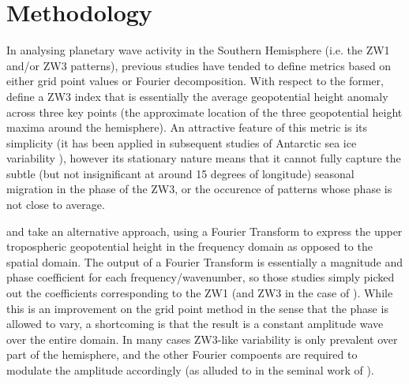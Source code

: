 \section{Methodology}

In analysing planetary wave activity in the Southern Hemisphere (i.e. the ZW1 and/or ZW3 patterns), previous studies have tended to define metrics based on either grid point values or Fourier decomposition. With respect to the former, \citet{Raphael2004} define a ZW3 index that is essentially the average geopotential height anomaly across three key points (the approximate location of the three geopotential height maxima around the hemisphere). An attractive feature of this metric is its simplicity (it has been applied in subsequent studies of Antarctic sea ice variability \citep{Raphael2007,Raphael2014}), however its stationary nature means that it cannot fully capture the subtle (but not insignificant at around 15 degrees of longitude) seasonal migration in the phase of the ZW3, or the occurence of patterns whose phase is not close to average.

\citet{Hobbs2007} and \citet{Hobbs2010} take an alternative approach, using a Fourier Transform to express the upper tropospheric geopotential height in the frequency domain as opposed to the spatial domain. The output of a Fourier Transform is essentially a magnitude and phase coefficient for each frequency/wavenumber, so those studies simply picked out the coefficients corresponding to the ZW1 (and ZW3 in the case of \citet{Hobbs2010}). While this is an improvement on the grid point method in the sense that the phase is allowed to vary, a shortcoming is that the result is a constant amplitude wave over the entire domain. In many cases ZW3-like variability is only prevalent over part of the hemisphere, and the other Fourier compoents are required to modulate the amplitude accordingly (as alluded to in the seminal work of \citet{vanLoon1972}).

